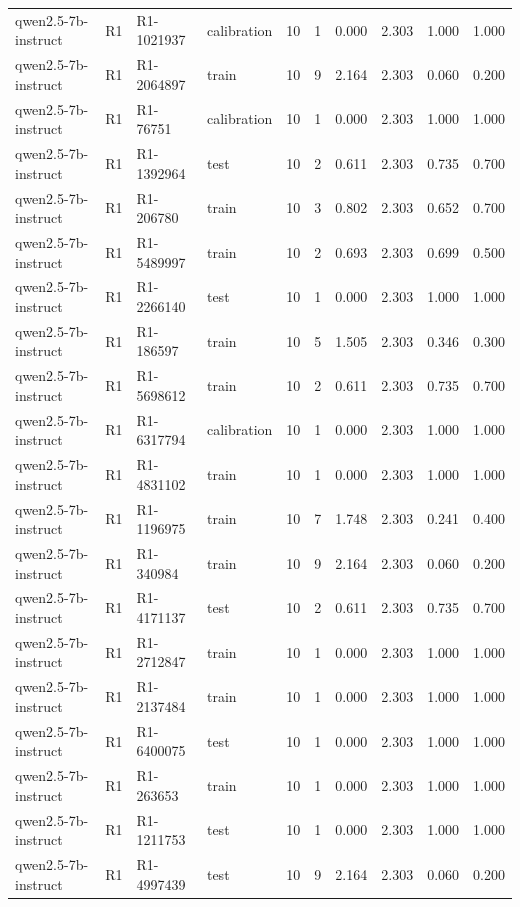 \begin{table}
\begin{tabular}{llllrrrrrr}
qwen2.5-7b-instruct & R1 & R1-1021937 & calibration & 10 & 1 & 0.000 & 2.303 & 1.000 & 1.000 \\
qwen2.5-7b-instruct & R1 & R1-2064897 & train & 10 & 9 & 2.164 & 2.303 & 0.060 & 0.200 \\
qwen2.5-7b-instruct & R1 & R1-76751 & calibration & 10 & 1 & 0.000 & 2.303 & 1.000 & 1.000 \\
qwen2.5-7b-instruct & R1 & R1-1392964 & test & 10 & 2 & 0.611 & 2.303 & 0.735 & 0.700 \\
qwen2.5-7b-instruct & R1 & R1-206780 & train & 10 & 3 & 0.802 & 2.303 & 0.652 & 0.700 \\
qwen2.5-7b-instruct & R1 & R1-5489997 & train & 10 & 2 & 0.693 & 2.303 & 0.699 & 0.500 \\
qwen2.5-7b-instruct & R1 & R1-2266140 & test & 10 & 1 & 0.000 & 2.303 & 1.000 & 1.000 \\
qwen2.5-7b-instruct & R1 & R1-186597 & train & 10 & 5 & 1.505 & 2.303 & 0.346 & 0.300 \\
qwen2.5-7b-instruct & R1 & R1-5698612 & train & 10 & 2 & 0.611 & 2.303 & 0.735 & 0.700 \\
qwen2.5-7b-instruct & R1 & R1-6317794 & calibration & 10 & 1 & 0.000 & 2.303 & 1.000 & 1.000 \\
qwen2.5-7b-instruct & R1 & R1-4831102 & train & 10 & 1 & 0.000 & 2.303 & 1.000 & 1.000 \\
qwen2.5-7b-instruct & R1 & R1-1196975 & train & 10 & 7 & 1.748 & 2.303 & 0.241 & 0.400 \\
qwen2.5-7b-instruct & R1 & R1-340984 & train & 10 & 9 & 2.164 & 2.303 & 0.060 & 0.200 \\
qwen2.5-7b-instruct & R1 & R1-4171137 & test & 10 & 2 & 0.611 & 2.303 & 0.735 & 0.700 \\
qwen2.5-7b-instruct & R1 & R1-2712847 & train & 10 & 1 & 0.000 & 2.303 & 1.000 & 1.000 \\
qwen2.5-7b-instruct & R1 & R1-2137484 & train & 10 & 1 & 0.000 & 2.303 & 1.000 & 1.000 \\
qwen2.5-7b-instruct & R1 & R1-6400075 & test & 10 & 1 & 0.000 & 2.303 & 1.000 & 1.000 \\
qwen2.5-7b-instruct & R1 & R1-263653 & train & 10 & 1 & 0.000 & 2.303 & 1.000 & 1.000 \\
qwen2.5-7b-instruct & R1 & R1-1211753 & test & 10 & 1 & 0.000 & 2.303 & 1.000 & 1.000 \\
qwen2.5-7b-instruct & R1 & R1-4997439 & test & 10 & 9 & 2.164 & 2.303 & 0.060 & 0.200 \\

\end{tabular}
\end{table}
